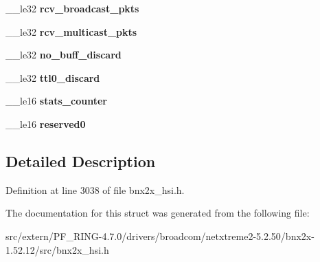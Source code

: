 \begin{DoxyCompactItemize}
\item 
\hypertarget{structtstorm__per__client__stats_af2ac8dcc8f91c93ad0834e4d64cb9414}{
\_\-\_\-le32 {\bfseries rcv\_\-broadcast\_\-pkts}}
\label{structtstorm__per__client__stats_af2ac8dcc8f91c93ad0834e4d64cb9414}

\item 
\hypertarget{structtstorm__per__client__stats_a83c6d853977d2b44d34b3c289aa381ed}{
\_\-\_\-le32 {\bfseries rcv\_\-multicast\_\-pkts}}
\label{structtstorm__per__client__stats_a83c6d853977d2b44d34b3c289aa381ed}

\item 
\hypertarget{structtstorm__per__client__stats_a488e70ff0e867ab1b323cae5799f91b7}{
\_\-\_\-le32 {\bfseries no\_\-buff\_\-discard}}
\label{structtstorm__per__client__stats_a488e70ff0e867ab1b323cae5799f91b7}

\item 
\hypertarget{structtstorm__per__client__stats_a0b611ed6c9acdc2d842b5e7a4f0d640d}{
\_\-\_\-le32 {\bfseries ttl0\_\-discard}}
\label{structtstorm__per__client__stats_a0b611ed6c9acdc2d842b5e7a4f0d640d}

\item 
\hypertarget{structtstorm__per__client__stats_af2bc600654ee793688386fc248e3546f}{
\_\-\_\-le16 {\bfseries stats\_\-counter}}
\label{structtstorm__per__client__stats_af2bc600654ee793688386fc248e3546f}

\item 
\hypertarget{structtstorm__per__client__stats_a2d16538da229e778606d32eef3cbd161}{
\_\-\_\-le16 {\bfseries reserved0}}
\label{structtstorm__per__client__stats_a2d16538da229e778606d32eef3cbd161}

\end{DoxyCompactItemize}


\subsection{Detailed Description}


Definition at line 3038 of file bnx2x\_\-hsi.h.



The documentation for this struct was generated from the following file:\begin{DoxyCompactItemize}
\item 
src/extern/PF\_\-RING-\/4.7.0/drivers/broadcom/netxtreme2-\/5.2.50/bnx2x-\/1.52.12/src/bnx2x\_\-hsi.h\end{DoxyCompactItemize}
